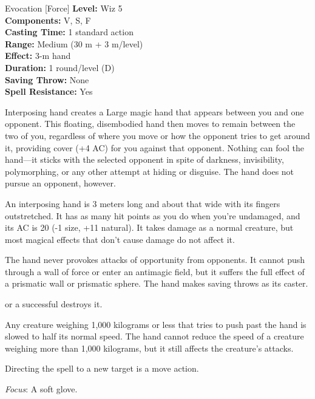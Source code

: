 {Evocation [Force]}
{
	\textbf{Level:}
	Wiz 5\\
	\textbf{Components:}
	V, S, F\\
	\textbf{Casting Time:}
	1 standard action\\
	\textbf{Range:}
	Medium (30 m + 3 m/level)\\
	\textbf{Effect:}
	3-m hand\\
	\textbf{Duration:}
	1 round/level (D)\\
	\textbf{Saving Throw:}
	None\\
	\textbf{Spell Resistance:}
	Yes\\
}
{
	Interposing hand creates a Large magic hand that appears between you and one opponent. This floating, disembodied hand then moves to remain between the two of you, regardless of where you move or how the opponent tries to get around it, providing cover (+4 AC) for you against that opponent. Nothing can fool the hand---it sticks with the selected opponent in spite of darkness, invisibility, polymorphing, or any other attempt at hiding or disguise. The hand does not pursue an opponent, however.

	An interposing hand is 3 meters long and about that wide with its fingers outstretched. It has as many hit points as you do when you're undamaged, and its AC is 20 (-1 size, +11 natural). It takes damage as a normal creature, but most magical effects that don't cause damage do not affect it.

	The hand never provokes attacks of opportunity from opponents. It cannot push through a wall of force or enter an antimagic field, but it suffers the full effect of a prismatic wall or prismatic sphere. The hand makes saving throws as its caster.

	 or a successful  destroys it.

	Any creature weighing 1,000 kilograms or less that tries to push past the hand is slowed to half its normal speed. The hand cannot reduce the speed of a creature weighing more than 1,000 kilograms, but it still affects the creature's attacks.

	Directing the spell to a new target is a move action.

	\textit{Focus}:
	A soft glove.

}
